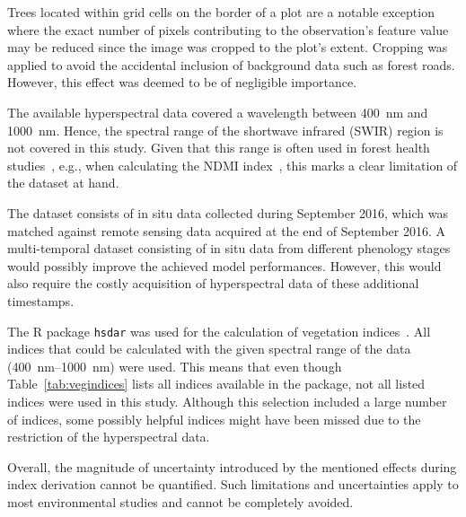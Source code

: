 \documentclass[remotesensing,article,accept,moreauthors,pdftex]{Definitions/mdpi}
\begin{document}
\begin{paracol}{2}
Trees located within grid cells on the border of a plot are a notable exception where the exact number of pixels contributing to the observation's feature value may be reduced since the image was cropped to the plot's extent.
Cropping was applied to avoid the accidental inclusion of background data such as forest roads.
However, this effect was deemed to be of negligible importance.

The available hyperspectral data covered a wavelength between 400~nm and 1000~nm.
Hence, the spectral range of the shortwave infrared (SWIR) region is not covered in this study.
Given that this range is often used in forest health studies~\cite{hais2019}, e.g., when calculating the \ac{NDMI} index~\cite{gao1996}, this marks a clear limitation of the dataset at hand.

The dataset consists of in situ data collected during September 2016, which was matched against remote sensing data acquired at the end of September 2016.
A multi-temporal dataset consisting of in situ data from different phenology stages would possibly improve the achieved model performances.
However, this would also require the costly acquisition of hyperspectral data of these additional timestamps.

The R package \texttt{hsdar} was used for the calculation of vegetation indices~\cite{lehnert2016}.
All indices that could be calculated with the given spectral range of the data (400~nm--1000~nm) were used.
This means that even though Table~\ref{tab:vegindices} lists all indices available in the package, not all listed indices were used in this study.
Although this selection included a large number of indices, some possibly helpful indices might have been missed due to the restriction of the hyperspectral data.

Overall, the magnitude of uncertainty introduced by the mentioned effects during index derivation cannot be quantified.
Such limitations and uncertainties apply to most environmental studies and cannot be completely avoided.


\end{paracol}
\end{document}
